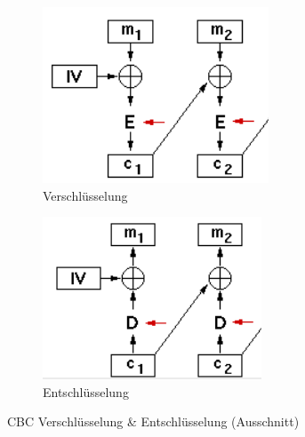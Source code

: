 \begin{figure}[h]
    \centering
    \begin{subfigure}[b]{0.4\textwidth}
        \centering
        \includegraphics[width=\textwidth]{img/encryption.png}
        \caption{Verschlüsselung}
        \label{fig:cbc_enc}
    \end{subfigure}
    \hfill
    \begin{subfigure}[b]{0.4\textwidth}
        \centering
        \includegraphics[width=\textwidth]{img/decryption.png}
        \caption{Entschlüsselung}
        \label{fig:cbc_dec}
    \end{subfigure}
    \caption{CBC Verschlüsselung \& Entschlüsselung (Ausschnitt)}
    \label{fig:cbc}
\end{figure}
